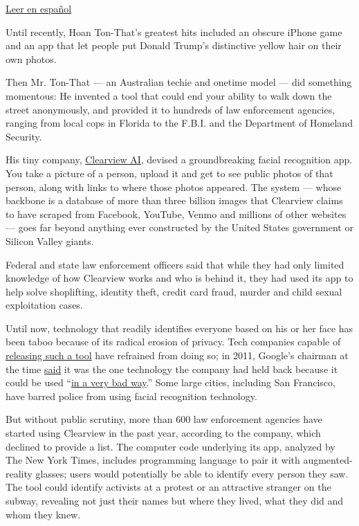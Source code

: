 \href{https://www.nytimes.com/es/2020/01/20/espanol/negocios/clearview-reconocimiento-facial.html}{Leer
en español}

Until recently, Hoan Ton-That's greatest hits included an obscure iPhone
game and an app that let people put Donald Trump's distinctive yellow
hair on their own photos.

Then Mr. Ton-That --- an Australian techie and onetime model --- did
something momentous: He invented a tool that could end your ability to
walk down the street anonymously, and provided it to hundreds of law
enforcement agencies, ranging from local cops in Florida to the F.B.I.
and the Department of Homeland Security.

His tiny company,
\href{https://www.nytimes.com/2020/02/10/podcasts/the-daily/facial-recognition-surveillance.html}{Clearview
AI}, devised a groundbreaking facial recognition app. You take a picture
of a person, upload it and get to see public photos of that person,
along with links to where those photos appeared. The system --- whose
backbone is a database of more than three billion images that Clearview
claims to have scraped from Facebook, YouTube, Venmo and millions of
other websites --- goes far beyond anything ever constructed by the
United States government or Silicon Valley giants.

Federal and state law enforcement officers said that while they had only
limited knowledge of how Clearview works and who is behind it, they had
used its app to help solve shoplifting, identity theft, credit card
fraud, murder and child sexual exploitation cases.

Until now, technology that readily identifies everyone based on his or
her face has been taboo because of its radical erosion of privacy. Tech
companies capable of
\href{https://www.cnet.com/news/facebook-built-a-facial-recognition-app-for-employees/}{releasing
such a tool} have refrained from doing so; in 2011, Google's chairman at
the time
\href{https://www.telegraph.co.uk/technology/google/8522574/Google-warns-against-facial-recognition-database.html}{said}
it was the one technology the company had held back because it could be
used
``\href{https://webcache.googleusercontent.com/search?q=cache:MwDlXjKEg2oJ:https://www.huffpost.com/entry/facial-recognition-google_n_869583+\&cd=3\&hl=en\&ct=clnk\&gl=us}{in
a very bad way}.'' Some large cities, including San Francisco, have
barred police from using facial recognition technology.

But without public scrutiny, more than 600 law enforcement agencies have
started using Clearview in the past year, according to the company,
which declined to provide a list. The computer code underlying its app,
analyzed by The New York Times, includes programming language to pair it
with augmented-reality glasses; users would potentially be able to
identify every person they saw. The tool could identify activists at a
protest or an attractive stranger on the subway, revealing not just
their names but where they lived, what they did and whom they knew.

